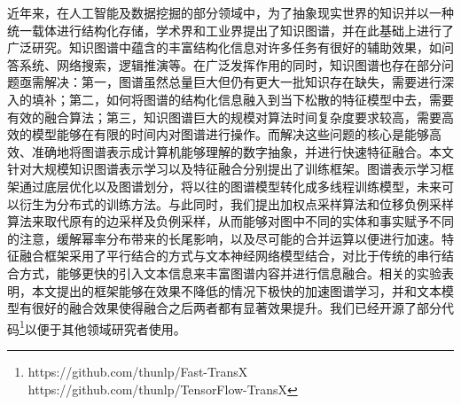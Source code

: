 \begin{cabstract}

  近年来，在人工智能及数据挖掘的部分领域中，为了抽象现实世界的知识并以一种统一载体进行结构化存储，学术界和工业界提出了知识图谱，并在此基础上进行了广泛研究。知识图谱中蕴含的丰富结构化信息对许多任务有很好的辅助效果，如问答系统、网络搜索，逻辑推演等。在广泛发挥作用的同时，知识图谱也存在部分问题亟需解决：第一，图谱虽然总量巨大但仍有更大一批知识存在缺失，需要进行深入的填补；第二，如何将图谱的结构化信息融入到当下松散的特征模型中去，需要有效的融合算法；第三，知识图谱巨大的规模对算法时间复杂度要求较高，需要高效的模型能够在有限的时间内对图谱进行操作。而解决这些问题的核心是能够高效、准确地将图谱表示成计算机能够理解的数字抽象，并进行快速特征融合。本文针对大规模知识图谱表示学习以及特征融合分别提出了训练框架。图谱表示学习框架通过底层优化以及图谱划分，将以往的图谱模型转化成多线程训练模型，未来可以衍生为分布式的训练方法。与此同时，我们提出加权点采样算法和位移负例采样算法来取代原有的边采样及负例采样，从而能够对图中不同的实体和事实赋予不同的注意，缓解幂率分布带来的长尾影响，以及尽可能的合并运算以便进行加速。特征融合框架采用了平行结合的方式与文本神经网络模型结合，对比于传统的串行结合方式，能够更快的引入文本信息来丰富图谱内容并进行信息融合。相关的实验表明，本文提出的框架能够在效果不降低的情况下极快的加速图谱学习，并和文本模型有很好的融合效果使得融合之后两者都有显著效果提升。我们已经开源了部分代码\footnote{https://github.com/thunlp/Fast-TransX \\ https://github.com/thunlp/TensorFlow-TransX}以便于其他领域研究者使用。

\end{cabstract}


